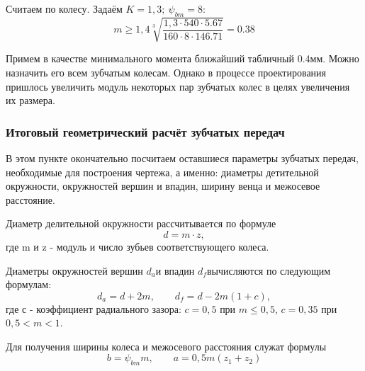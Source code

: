 \documentclass[14pt,a4paper,russian]{scrartcl}
\begin{document}
        Считаем по колесу. Задаём \( K=1,3;\ \psi_{bm}=8 \):
        \[ m \geq 1,4\sqrt[3]{\frac{1,3\cdot 540\cdot 5.67}{160\cdot 8\cdot 146.71}}=0.38 \]
        
        Примем в качестве минимального момента ближайший табличный 0.4мм. Можно назначить его
        всем зубчатым колесам. Однако в процессе проектирования пришлось увеличить модуль некоторых
        пар зубчатых колес в целях увеличения их размера.

    
    \subsubsection{Итоговый геометрический расчёт зубчатых передач}
        В этом пункте окончательно посчитаем оставшиеся параметры зубчатых передач,
        необходимые для построения чертежа, а именно: диаметры детительной окружности, окружностей вершин
        и впадин, ширину венца и межосевое расстояние.\par

        Диаметр делительной окружности рассчитывается по формуле
        \[ d = m\cdot z, \]
        где m и z - модуль и число зубьев соответствующего колеса.\par

        Диаметры окружностей вершин \( d_a \)и впадин \( d_f \)вычисляются по следующим формулам:
        \[ d_a = d + 2m,\qquad d_f = d - 2m(1+c),\]
        где с - коэффициент радиального зазора: 
            \( c=0,5 \) при \( m\leq 0,5 \), \( c=0,35 \) при \( 0,5<m<1 \).
        
        Для получения ширины колеса и межосевого расстояния служат формулы
        \[ b=\psi_{bm}m, \qquad  a = 0,5m(z_1+z_2)\]
        
\end{document}
